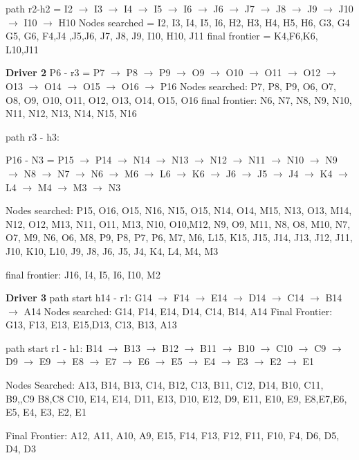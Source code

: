 \documentclass{article}
\begin{document}
path r2-h2 = I2 $\to$ I3 $\to$ I4 $\to$ I5 $\to$ I6 $\to$ J6 $\to$ J7 $\to$ J8 $\to$ J9 $\to$ J10 $\to$ I10 $\to$ H10 \newline
Nodes searched = I2, I3, I4, I5, I6, H2, H3, H4, H5, H6, G3, G4 G5, G6, F4,J4 ,J5,J6, J7, J8, J9, I10, H10, J11 \newline
final frontier = K4,F6,K6, L10,J11\newline

\textbf{Driver 2} \newline
P6 - r3 = P7 $\to$ P8 $\to$ P9 $\to$ O9 $\to$ O10 $\to$ O11 $\to$ O12 $\to$ O13 $\to$ O14 $\to$ O15 $\to$ O16 $\to$ P16 \newline
Nodes searched: P7, P8, P9, O6, O7, O8, O9, O10, O11, O12, O13, O14, O15, O16\newline
final frontier: N6, N7, N8, N9, N10, N11, N12, N13, N14, N15, N16 \newline


path r3 - h3:

P16 - N3 = P15 $\to$ P14 $\to$ N14 $\to$ N13 $\to$ N12 $\to$ N11 $\to$ N10 $\to$ N9 $\to$ N8 $\to$ N7 $\to$ N6 $\to$ M6 $\to$ L6 $\to$ K6 $\to$ J6 $\to$ J5 $\to$ J4 $\to$ K4 $\to$ L4 $\to$ M4 $\to$ M3 $\to$ N3

Nodes searched: P15, O16, O15, N16, N15, O15, N14, O14, M15, N13, O13, M14, N12, O12, M13, N11, O11, M13, N10, O10,M12, N9, O9, M11, N8, O8, M10, N7, O7, M9, N6, O6, M8, P9, P8, P7, P6, M7, M6, L15, K15, J15, J14, J13, J12, J11, J10, K10, L10, J9, J8, J6, J5, J4, K4, L4, M4, M3 \newline

final frontier: J16, I4, I5, I6, I10, M2

\textbf{Driver 3} \newline
path start h14 - r1: G14 $\to$ F14 $\to$ E14 $\to$ D14 $\to$ C14 $\to$ B14 $\to$ A14
Nodes searched: G14, F14, E14, D14, C14, B14, A14
Final Frontier: G13, F13, E13, E15,D13, C13, B13, A13


path start r1 - h1: B14 $\to$ B13 $\to$ B12 $\to$ B11 $\to$ B10 $\to$ C10 $\to$ C9 $\to$ D9 $\to$ E9 $\to$ E8 $\to$ E7 $\to$ E6 $\to$ E5 $\to$ E4 $\to$ E3 $\to$ E2 $\to$ E1 \newline

Nodes Searched: A13, B14, B13, C14, B12, C13, B11, C12, D14, B10, C11, B9,,C9 B8,C8  C10, E14, E14, D11, E13, D10, E12, D9, E11, E10, E9, E8,E7,E6, E5, E4, E3, E2, E1 

Final Frontier: A12, A11, A10, A9, E15, F14, F13, F12, F11, F10, F4, D6, D5, D4, D3\newline
\end{document}

